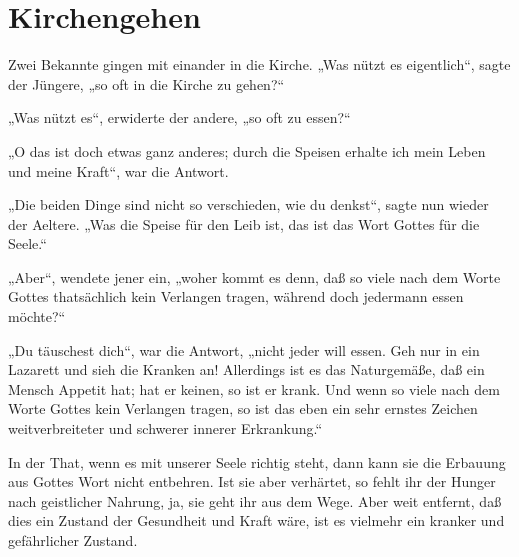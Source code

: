 \chapter{Kirchengehen}

Zwei Bekannte gingen mit einander in die Kirche. „Was nützt es eigentlich“, sagte der Jüngere, „so oft in die Kirche zu gehen?“

„Was nützt es“, erwiderte der andere, „so oft zu essen?“

„O das ist doch etwas ganz anderes; durch die Speisen erhalte ich mein Leben und meine Kraft“, war die Antwort.

„Die beiden Dinge sind nicht so verschieden, wie du denkst“, sagte nun wieder der Aeltere. „Was die Speise für den Leib ist, das ist das Wort Gottes für die Seele.“

„Aber“, wendete jener ein, „woher kommt es denn, daß so viele nach dem Worte Gottes thatsächlich kein Verlangen tragen, während doch jedermann essen möchte?“

„Du täuschest dich“, war die Antwort, „nicht jeder will essen. Geh nur in ein Lazarett und sieh die Kranken an! Allerdings ist es das Naturgemäße, daß ein Mensch Appetit hat; hat er keinen, so ist er krank. Und wenn so viele nach dem Worte Gottes kein Verlangen tragen, so ist das eben ein sehr ernstes Zeichen weitverbreiteter und schwerer innerer Erkrankung.“

In der That, wenn es mit unserer Seele richtig steht, dann kann sie die Erbauung aus Gottes Wort nicht entbehren. Ist sie aber verhärtet, so fehlt ihr der Hunger nach geistlicher Nahrung, ja, sie geht ihr aus dem Wege. Aber weit entfernt, daß dies ein Zustand der Gesundheit und Kraft wäre, ist es vielmehr ein kranker und gefährlicher Zustand.
